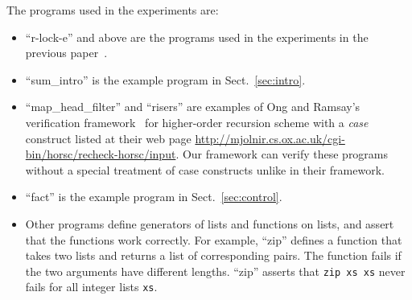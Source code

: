 The programs used in the experiments are:
\begin{itemize}
\item ``r-lock-e'' and above are the programs used in the experiments in
      the previous paper~\cite{KobayashiPLDI2011}.
\item ``sum\_intro'' is the example program in Sect.~\ref{sec:intro}.
\item ``map\_head\_filter'' and ``risers'' are examples of Ong and
      Ramsay's verification framework~\cite{Ong2011} for higher-order
      recursion scheme with a \textit{case} construct listed at their
      web page
      \url{http://mjolnir.cs.ox.ac.uk/cgi-bin/horsc/recheck-horsc/input}.
      Our framework can verify these programs without a special
      treatment of case constructs unlike in their framework.
\item ``fact'' is the example program in Sect.~\ref{sec:control}.
\item Other programs define generators of lists and functions on lists,
      and assert that the functions work correctly.  For example,
      ``zip'' defines a function that takes two lists and returns a list of corresponding pairs.
      The function fails if the two arguments have different lengths.
      ``zip'' asserts that \texttt{zip xs xs} never fails for all integer lists \texttt{xs}.
\end{itemize}
